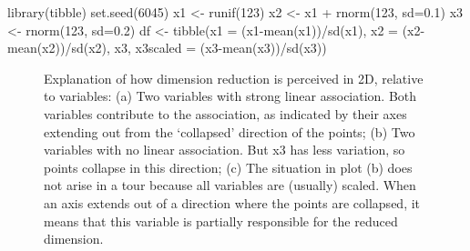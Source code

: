 \documentclass[
  letterpaper,
]{krantz}
\newenvironment{Shaded}{\begin{snugshade}}{\end{snugshade}}
\newcommand{\AttributeTok}[1]{\textcolor[rgb]{0.40,0.45,0.13}{#1}}
\newcommand{\DecValTok}[1]{\textcolor[rgb]{0.68,0.00,0.00}{#1}}
\newcommand{\FloatTok}[1]{\textcolor[rgb]{0.68,0.00,0.00}{#1}}
\newcommand{\FunctionTok}[1]{\textcolor[rgb]{0.28,0.35,0.67}{#1}}
\newcommand{\NormalTok}[1]{\textcolor[rgb]{0.00,0.23,0.31}{#1}}
\newcommand{\OtherTok}[1]{\textcolor[rgb]{0.00,0.23,0.31}{#1}}
\newcommand{\SpecialCharTok}[1]{\textcolor[rgb]{0.37,0.37,0.37}{#1}}
\begin{document}
\begin{Shaded}
\begin{Highlighting}[]
\FunctionTok{library}\NormalTok{(tibble)}
\FunctionTok{set.seed}\NormalTok{(}\DecValTok{6045}\NormalTok{)}
\NormalTok{x1 }\OtherTok{\textless{}{-}} \FunctionTok{runif}\NormalTok{(}\DecValTok{123}\NormalTok{)}
\NormalTok{x2 }\OtherTok{\textless{}{-}}\NormalTok{ x1 }\SpecialCharTok{+} \FunctionTok{rnorm}\NormalTok{(}\DecValTok{123}\NormalTok{, }\AttributeTok{sd=}\FloatTok{0.1}\NormalTok{)}
\NormalTok{x3 }\OtherTok{\textless{}{-}} \FunctionTok{rnorm}\NormalTok{(}\DecValTok{123}\NormalTok{, }\AttributeTok{sd=}\FloatTok{0.2}\NormalTok{)}
\NormalTok{df }\OtherTok{\textless{}{-}} \FunctionTok{tibble}\NormalTok{(}\AttributeTok{x1 =}\NormalTok{ (x1}\SpecialCharTok{{-}}\FunctionTok{mean}\NormalTok{(x1))}\SpecialCharTok{/}\FunctionTok{sd}\NormalTok{(x1), }
             \AttributeTok{x2 =}\NormalTok{ (x2}\SpecialCharTok{{-}}\FunctionTok{mean}\NormalTok{(x2))}\SpecialCharTok{/}\FunctionTok{sd}\NormalTok{(x2),}
\NormalTok{             x3, }
             \AttributeTok{x3scaled =}\NormalTok{ (x3}\SpecialCharTok{{-}}\FunctionTok{mean}\NormalTok{(x3))}\SpecialCharTok{/}\FunctionTok{sd}\NormalTok{(x3))}
\end{Highlighting}
\end{Shaded}

\begin{figure}


\caption{\label{fig-2D}Explanation of how dimension reduction is
perceived in 2D, relative to variables: (a) Two variables with strong
linear association. Both variables contribute to the association, as
indicated by their axes extending out from the `collapsed' direction of
the points; (b) Two variables with no linear association. But x3 has
less variation, so points collapse in this direction; (c) The situation
in plot (b) does not arise in a tour because all variables are (usually)
scaled. When an axis extends out of a direction where the points are
collapsed, it means that this variable is partially responsible for the
reduced dimension.}

\end{figure}%
\end{document}
